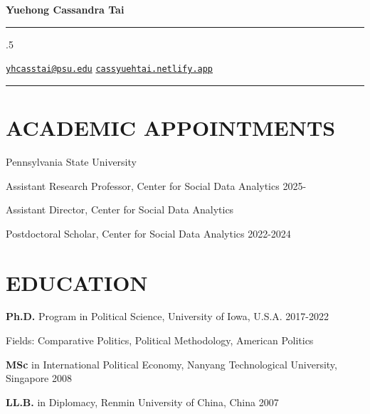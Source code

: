 \documentclass[10.5pt,]{article}
\providecommand{\tightlist}{%
	\setlength{\itemsep}{0pt}\setlength{\parskip}{0pt}}
\renewenvironment{itemize}{
	\begin{list}{}{
			\setlength{\leftmargin}{1.5em}
		}
	}{
	\end{list}
}
\begin{document}
	
	
	\centerline{\huge \bf Yuehong Cassandra Tai}
	
	
	
	\vspace{2 mm}
	
	\hrule
	
	\vspace{2 mm}
	
	
	
	\moveleft.5\hoffset\centerline{ {\FA\faEnvelope} \hspace{1 mm} \href{mailto:}{\tt \href{mailto:yhcasstai@psu.edu}{\nolinkurl{yhcasstai@psu.edu}}} \hspace{1 mm}     {\FA\faGlobe} \hspace{1 mm} \href{http://cassyuehtai.netlify.app}{\tt cassyuehtai.netlify.app}   }
	
	\vspace{2 mm}
	
	\hrule
	
		
	\section{ACADEMIC APPOINTMENTS}\label{academic-appointments}

\begin{itemize}
\tightlist
\item
  Pennsylvania State University

  \begin{itemize}
  \tightlist
  \item
    Assistant Research Professor, Center for Social Data Analytics
    \hfill 2025-
  \item
    Assistant Director, Center for Social Data Analytics
  \item
    Postdoctoral Scholar, Center for Social Data Analytics
    \hfill 2022-2024
  \end{itemize}
\end{itemize}

\section{EDUCATION}\label{education}

\begin{itemize}
\tightlist
\item
  \textbf{Ph.D.} Program in Political Science, University of Iowa,
  U.S.A. \hfill 2017-2022

  \begin{itemize}
  \tightlist
  \item
    Fields: Comparative Politics, Political Methodology, American
    Politics
  \end{itemize}
\item
  \textbf{MSc} in International Political Economy, Nanyang Technological
  University, Singapore \hfill 2008
\item
  \textbf{LL.B.} in Diplomacy, Renmin University of China, China
  \hfill 2007
\end{itemize}
\end{document}
